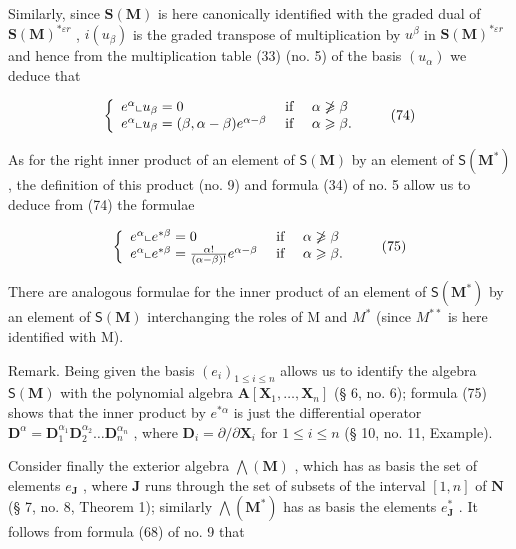 Similarly, since \(\mathbf{S}(\mathbf{M})\) is here canonically identified with the graded dual of \(\mathbf{S}(\mathbf{M})^{*\varepsilon r}\) , \(i(u_{\beta})\) is the graded transpose of multiplication by \(u^{\beta}\) in \(\mathbf{S}(\mathbf{M})^{*\varepsilon r}\) and hence from the multiplication table (33) (no. 5) of the basis \((u_{\alpha})\) we deduce that

\[
\left\{ \begin{array}{l l} e ^ {\alpha} \llcorner u _ {\beta} = 0 & \text { if } \quad \alpha \not \geqslant \beta \\ e ^ {\alpha} \llcorner u _ {\beta} = (\beta , \alpha - \beta) e ^ {\alpha - \beta} & \text { if } \quad \alpha \geqslant \beta . \end{array} \right.\tag{74}
\]

As for the right inner product of an element of \(\mathsf{S}(\mathbf{M})\) by an element of \(\mathsf{S}(\mathbf{M}^*)\) , the definition of this product (no. 9) and formula (34) of no. 5 allow us to deduce from (74) the formulae

\[
\left\{ \begin{array}{l l} e ^ {\alpha} \llcorner e ^ {* \beta} = 0 & \text { if } \quad \alpha \not \geqslant \beta \\ e ^ {\alpha} \llcorner e ^ {* \beta} = \frac {\alpha !}{(\alpha - \beta) !} e ^ {\alpha - \beta} & \text { if } \quad \alpha \geqslant \beta . \end{array} \right.\tag{75}
\]

There are analogous formulae for the inner product of an element of \(\mathsf{S}(\mathbf{M}^{*})\) by an element of \(\mathsf{S}(\mathbf{M})\) interchanging the roles of M and \(M^{*}\) (since \(M^{**}\) is here identified with M).

Remark. Being given the basis \((e_i)_{1\leq i\leq n}\) allows us to identify the algebra \(\mathsf{S}(\mathbf{M})\) with the polynomial algebra \(\mathbf{A}[\mathbf{X}_1,\ldots ,\mathbf{X}_n]\) (§ 6, no. 6); formula (75) shows that the inner product by \(e^{*\alpha}\) is just the differential operator \(\mathbf{D}^{\alpha} = \mathbf{D}_{1}^{\alpha_{1}}\mathbf{D}_{2}^{\alpha_{2}}\ldots \mathbf{D}_{n}^{\alpha_{n}}\) , where \(\mathbf{D}_i = \partial /\partial \mathbf{X}_i\) for \(1\leqslant i\leqslant n\) (§ 10, no. 11, Example).

Consider finally the exterior algebra \(\bigwedge (\mathbf{M})\) , which has as basis the set of elements \(e_{\mathbf{J}}\) , where \(\mathbf{J}\) runs through the set of subsets of the interval \([1, n]\) of \(\mathbf{N}\) (§ 7, no. 8, Theorem 1); similarly \(\bigwedge (\mathbf{M}^*)\) has as basis the elements \(e_{\mathbf{J}}^{*}\) . It follows from formula (68) of no. 9 that

